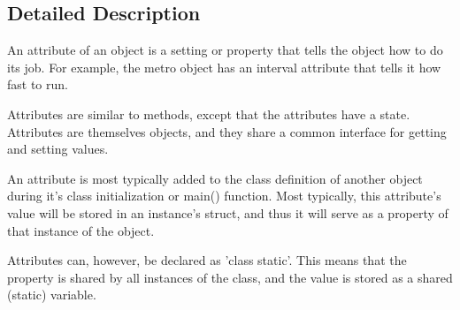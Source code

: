 

\subsection{Detailed Description}
An attribute of an object is a setting or property that tells the object how to do its job. For example, the metro object has an interval attribute that tells it how fast to run.

Attributes are similar to methods, except that the attributes have a state. Attributes are themselves objects, and they share a common interface for getting and setting values.

An attribute is most typically added to the class definition of another object during it's class initialization or main() function. Most typically, this attribute's value will be stored in an instance's struct, and thus it will serve as a property of that instance of the object.

Attributes can, however, be declared as 'class static'. This means that the property is shared by all instances of the class, and the value is stored as a shared (static) variable.

